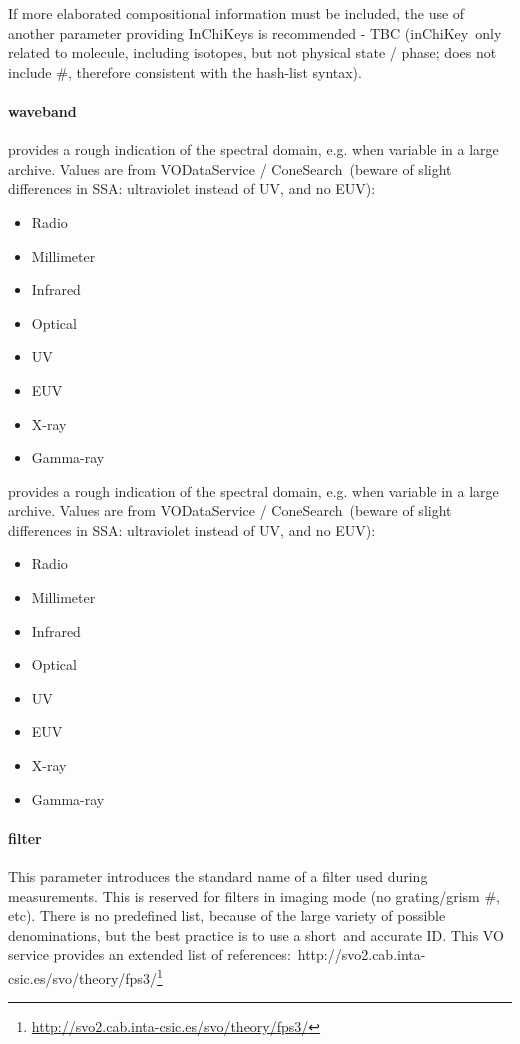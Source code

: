 \documentclass[11pt,a4paper]{ivoa}
\begin{document}
If more elaborated compositional information must be included, the use of another parameter providing InChiKeys is recommended - TBC (inChiKey only related to molecule, including isotopes, but not physical state / phase; does not include \#, therefore consistent with the hash-list syntax).\\

\paragraph{waveband}

provides a rough indication of the spectral domain, e.g. when variable in a large archive. Values are from VODataService / ConeSearch (beware of slight differences in SSA: ultraviolet instead of UV, and no EUV): 

\begin{itemize}
\item Radio
\item Millimeter
\item Infrared
\item Optical
\item UV
\item EUV
\item X-ray
\item Gamma-ray
\end{itemize}

provides a rough indication of the spectral domain, e.g. when variable in a large archive. Values are from VODataService / ConeSearch (beware of slight differences in SSA: ultraviolet instead of UV, and no EUV): 

\begin{itemize}
\item Radio
\item Millimeter
\item Infrared
\item Optical
\item UV
\item EUV
\item X-ray
\item Gamma-ray
\end{itemize}

\paragraph{filter}

This parameter introduces the standard name of a filter used during measurements. This is reserved for filters in imaging mode (no grating/grism \#, etc). There is no predefined list, because of the large variety of possible denominations, but the best practice is to use a short and accurate ID. This VO service provides an extended list of references: http://svo2.cab.inta-csic.es/svo/theory/fps3/\footnote{\url{http://svo2.cab.inta-csic.es/svo/theory/fps3/}}
\end{document}
